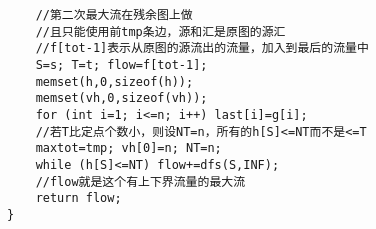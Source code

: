 \begin{verbatim}
    //第二次最大流在残余图上做
    //且只能使用前tmp条边，源和汇是原图的源汇
    //f[tot-1]表示从原图的源流出的流量，加入到最后的流量中
    S=s; T=t; flow=f[tot-1];
    memset(h,0,sizeof(h));
    memset(vh,0,sizeof(vh));
    for (int i=1; i<=n; i++) last[i]=g[i];
    //若T比定点个数小，则设NT=n，所有的h[S]<=NT而不是<=T
    maxtot=tmp; vh[0]=n; NT=n;
    while (h[S]<=NT) flow+=dfs(S,INF);
    //flow就是这个有上下界流量的最大流
    return flow;
}
\end{verbatim}
